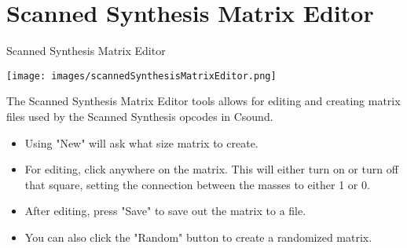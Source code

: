 \section{Scanned Synthesis Matrix
Editor}\label{scannedSynthesisMatrixEditor}

Scanned Synthesis Matrix Editor

\texttt{[image: images/scannedSynthesisMatrixEditor.png]}

The Scanned Synthesis Matrix Editor tools allows for editing and
creating matrix files used by the Scanned Synthesis opcodes in Csound.

\begin{itemize}
\tightlist
\item
  Using "New" will ask what size matrix to create.
\item
  For editing, click anywhere on the matrix. This will either turn on or
  turn off that square, setting the connection between the masses to
  either 1 or 0.
\item
  After editing, press "Save" to save out the matrix to a file.
\item
  You can also click the "Random" button to create a randomized matrix.
\end{itemize}

